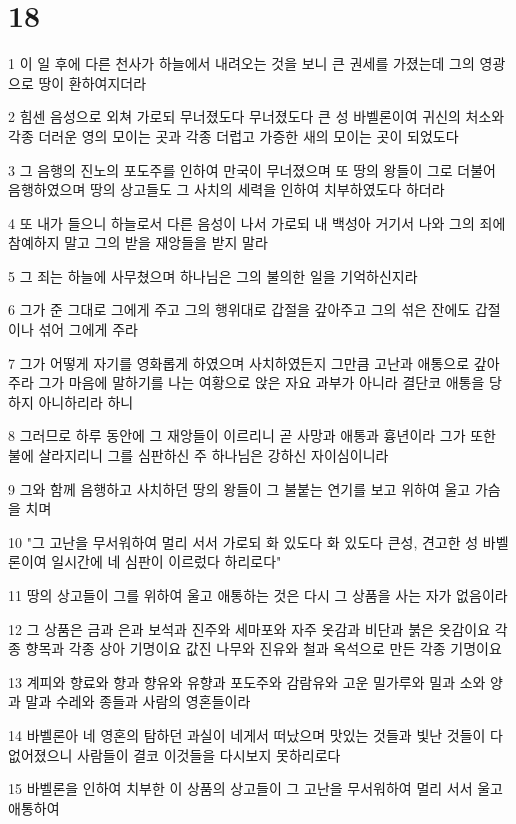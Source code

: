 \chapter{18}

\par 1 이 일 후에 다른 천사가 하늘에서 내려오는 것을 보니 큰 권세를 가졌는데 그의 영광으로 땅이 환하여지더라
\par 2 힘센 음성으로 외쳐 가로되 무너졌도다 무너졌도다 큰 성 바벨론이여 귀신의 처소와 각종 더러운 영의 모이는 곳과 각종 더럽고 가증한 새의 모이는 곳이 되었도다
\par 3 그 음행의 진노의 포도주를 인하여 만국이 무너졌으며 또 땅의 왕들이 그로 더불어 음행하였으며 땅의 상고들도 그 사치의 세력을 인하여 치부하였도다 하더라
\par 4 또 내가 들으니 하늘로서 다른 음성이 나서 가로되 내 백성아 거기서 나와 그의 죄에 참예하지 말고 그의 받을 재앙들을 받지 말라
\par 5 그 죄는 하늘에 사무쳤으며 하나님은 그의 불의한 일을 기억하신지라
\par 6 그가 준 그대로 그에게 주고 그의 행위대로 갑절을 갚아주고 그의 섞은 잔에도 갑절이나 섞어 그에게 주라
\par 7 그가 어떻게 자기를 영화롭게 하였으며 사치하였든지 그만큼 고난과 애통으로 갚아 주라 그가 마음에 말하기를 나는 여황으로 앉은 자요 과부가 아니라 결단코 애통을 당하지 아니하리라 하니
\par 8 그러므로 하루 동안에 그 재앙들이 이르리니 곧 사망과 애통과 흉년이라 그가 또한 불에 살라지리니 그를 심판하신 주 하나님은 강하신 자이심이니라
\par 9 그와 함께 음행하고 사치하던 땅의 왕들이 그 불붙는 연기를 보고 위하여 울고 가슴을 치며
\par 10 "그 고난을 무서워하여 멀리 서서 가로되 화 있도다 화 있도다 큰성, 견고한 성 바벨론이여 일시간에 네 심판이 이르렀다 하리로다"
\par 11 땅의 상고들이 그를 위하여 울고 애통하는 것은 다시 그 상품을 사는 자가 없음이라
\par 12 그 상품은 금과 은과 보석과 진주와 세마포와 자주 옷감과 비단과 붉은 옷감이요 각종 향목과 각종 상아 기명이요 값진 나무와 진유와 철과 옥석으로 만든 각종 기명이요
\par 13 계피와 향료와 향과 향유와 유향과 포도주와 감람유와 고운 밀가루와 밀과 소와 양과 말과 수레와 종들과 사람의 영혼들이라
\par 14 바벨론아 네 영혼의 탐하던 과실이 네게서 떠났으며 맛있는 것들과 빛난 것들이 다 없어졌으니 사람들이 결코 이것들을 다시보지 못하리로다
\par 15 바벨론을 인하여 치부한 이 상품의 상고들이 그 고난을 무서워하여 멀리 서서 울고 애통하여

